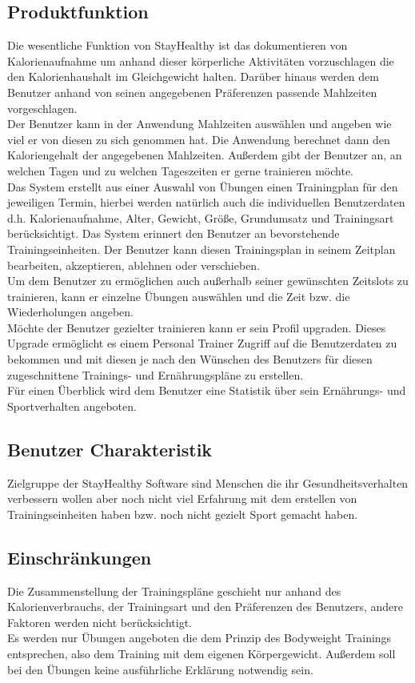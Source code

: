 \documentclass[12pt,a4paper,onecolumn]{article}
\begin{document}
\subsection{Produktfunktion}
Die wesentliche Funktion von StayHealthy ist das dokumentieren von Kalorienaufnahme um anhand dieser körperliche Aktivitäten vorzuschlagen die den Kalorienhaushalt im Gleichgewicht halten.
Darüber hinaus werden dem Benutzer anhand von seinen angegebenen Präferenzen passende \gls{Mahlzeit}en vorgeschlagen.
\\Der Benutzer kann in der Anwendung \gls{Mahlzeit}en auswählen und angeben wie viel er von diesen zu sich genommen hat. Die Anwendung berechnet dann den Kaloriengehalt der angegebenen \gls{Mahlzeit}en. Außerdem gibt der Benutzer an, an welchen Tagen und zu welchen Tageszeiten er gerne trainieren möchte. 
\\Das System erstellt aus einer Auswahl von \gls{Übung}en einen Trainingplan für den jeweiligen Termin, hierbei werden natürlich auch die individuellen Benutzerdaten d.h. Kalorienaufnahme, Alter, Gewicht, Größe, Grundumsatz und Trainingsart berücksichtigt. Das System erinnert den Benutzer an bevorstehende \gls{Trainingseinheit}en. Der Benutzer kann diesen \gls{Trainingsplan} in seinem \gls{Zeitplan} bearbeiten, akzeptieren, ablehnen oder verschieben. \\Um dem Benutzer zu ermöglichen auch außerhalb seiner gewünschten Zeitslots zu trainieren, kann er einzelne \gls{Übung}en auswählen und die Zeit bzw. die Wiederholungen angeben. \\
Möchte der Benutzer gezielter trainieren kann er sein Profil upgraden. Dieses Upgrade ermöglicht es einem Personal Trainer Zugriff auf die Benutzerdaten zu bekommen und mit diesen je nach den Wünschen des Benutzers für diesen zugeschnittene Trainings- und Ernährungspläne zu erstellen.\\
Für einen Überblick wird dem Benutzer eine Statistik über sein Ernährungs- und Sportverhalten angeboten.\\
\newpage
\subsection{Benutzer Charakteristik}
Zielgruppe der StayHealthy Software sind Menschen die ihr Gesundheitsverhalten verbessern wollen aber noch nicht viel Erfahrung mit dem erstellen von \gls{Trainingseinheit}en haben bzw. noch nicht gezielt Sport gemacht haben.
\subsection{Einschränkungen}
Die Zusammenstellung der Trainingspläne geschieht nur anhand des Kalorienverbrauchs, der Trainingsart und den Präferenzen des Benutzers, andere Faktoren werden nicht berücksichtigt.
\\Es werden nur \gls{Übung}en angeboten die dem Prinzip des Bodyweight Trainings entsprechen, also dem Training mit dem eigenen Körpergewicht. Außerdem soll bei den \gls{Übung}en keine ausführliche Erklärung notwendig sein.\\
\end{document}
